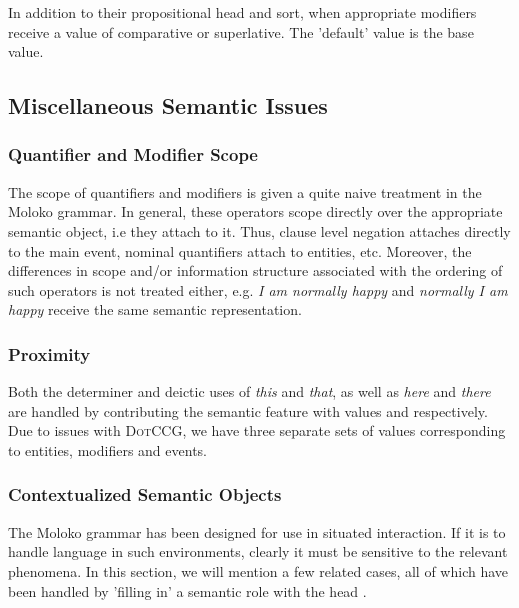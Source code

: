 In addition to their propositional head and sort, when appropriate modifiers receive a  value of comparative or superlative. The 'default' value is the base value. 


\subsection{Miscellaneous Semantic Issues}
\subsubsection{Quantifier and Modifier Scope}

The scope of quantifiers and modifiers is given a quite naive treatment in the Moloko grammar. In general, these operators scope directly over the appropriate semantic object, i.e they attach to it. Thus, clause level negation attaches directly to the main event, nominal quantifiers attach to entities, etc. Moreover, the differences in scope and/or information structure associated with the ordering of such operators is not treated either, e.g. \emph{I am normally happy} and \emph{normally I am happy} receive the same semantic representation.

\subsubsection{Proximity}

Both the determiner and deictic uses of \emph{this} and \emph{that}, as well as \emph{here} and \emph{there} are handled by contributing the semantic feature  with values  and  respectively. Due to issues with \textsc{DotCCG}, we have three separate sets of values corresponding to entities, modifiers and events.

\subsubsection{Contextualized Semantic Objects} \label{sec-Contextualized}

The Moloko grammar has been designed for use in situated interaction. If it is to handle language in such environments, clearly it must be sensitive to the relevant phenomena. In this section, we will mention a few related cases, all of which have been handled by 'filling in' a semantic role with the head . 

